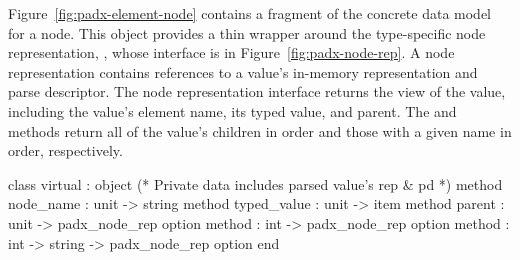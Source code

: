Figure~\ref{fig:padx-element-node} contains a fragment of the \padx{}
concrete data model for a node.  This object provides a thin wrapper
around the type-specific node representation, ,
whose interface is in Figure~\ref{fig:padx-node-rep}.  A node
representation contains references to a \pads{} value's in-memory
representation and parse descriptor.  The node representation
interface returns the \Xml{} view of the \pads{} value, including the
value's element name, its typed value, and parent.
The  and  methods 
return all of the \pads{} value's children in order and those with a
given name in order, respectively.
\begin{figure*}
\begin{small}
\begin{code}
class virtual  :
  object 
    (* Private data includes parsed value's rep \& pd *)
    method node\_name   : unit -> string
    method typed\_value : unit -> item
    method parent       : unit -> padx\_node\_rep option
    method    : int -> padx\_node\_rep option
    method  : int -> string -> padx\_node\_rep option
  end
\end{code}
\end{small}
\caption{The \padx{} node representation}
\label{fig:padx-node-rep}
\end{figure*}

